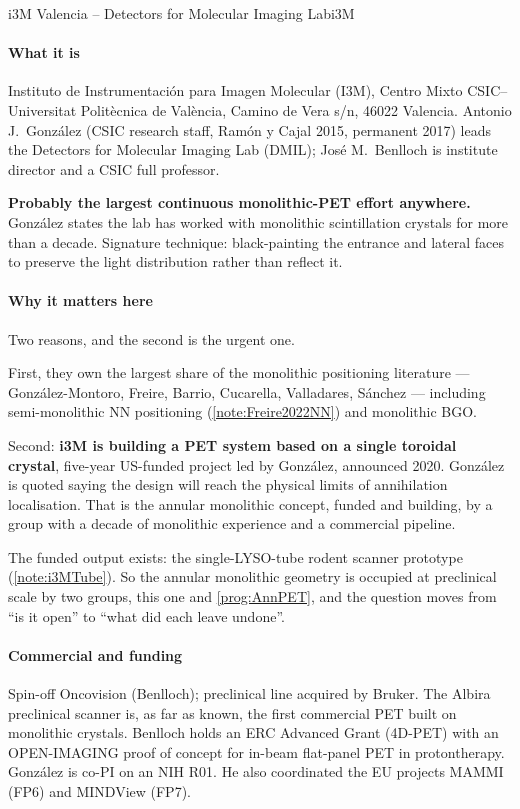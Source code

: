 \begin{programnote}{i3M Valencia -- Detectors for Molecular Imaging Lab}{i3M}
 
\paragraph{What it is}
Instituto de Instrumentación para Imagen Molecular (I3M), Centro Mixto
CSIC--Universitat Politècnica de València, Camino de Vera s/n, 46022 Valencia.
Antonio J.\ González (CSIC research staff, Ramón y Cajal 2015, permanent 2017)
leads the Detectors for Molecular Imaging Lab (DMIL); José M.\ Benlloch is
institute director and a CSIC full professor.
 
\textbf{Probably the largest continuous monolithic-PET effort anywhere.}
González states the lab has worked with monolithic scintillation crystals for
more than a decade. Signature technique: black-painting the entrance and lateral
faces to preserve the light distribution rather than reflect it.
 
\paragraph{Why it matters here}
Two reasons, and the second is the urgent one.
 
First, they own the largest share of the monolithic positioning literature ---
González-Montoro, Freire, Barrio, Cucarella, Valladares, Sánchez --- including
semi-monolithic NN positioning (\ref{note:Freire2022NN}) and monolithic BGO.
 
Second: \textbf{i3M is building a PET system based on a single toroidal
crystal}, five-year US-funded project led by González, announced 2020. González
is quoted saying the design will reach the physical limits of annihilation
localisation. That is the annular monolithic concept, funded and building, by a
group with a decade of monolithic experience and a commercial pipeline.
 
The funded output exists: the single-LYSO-tube rodent scanner prototype
(\ref{note:i3MTube}). So the annular monolithic geometry is occupied at
preclinical scale by two groups, this one and \ref{prog:AnnPET}, and the
question moves from ``is it open'' to ``what did each leave undone''.
 
\paragraph{Commercial and funding}
Spin-off Oncovision (Benlloch); preclinical line acquired by Bruker. The
Albira preclinical scanner is, as far as known, the first commercial PET built on
monolithic crystals. 
Benlloch holds an ERC Advanced Grant (4D-PET) with an OPEN-IMAGING proof of
concept for in-beam flat-panel PET in protontherapy. González is co-PI on an NIH
R01. He also coordinated the EU projects MAMMI (FP6) and MINDView (FP7).
 

\end{programnote}
